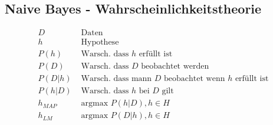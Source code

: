 \documentclass{article}
\newcommand{\prob}{\textit{P}}
\begin{document}
				\subsection*{Naive Bayes - Wahrscheinlichkeitstheorie}
					\begin{align*}
						D & \text{ Daten }\\
						h & \text{ Hypothese}\\
						\prob (h) & \text{ Warsch. dass $h$ erf\"ullt ist}\\
						\prob (D) & \text{ Warsch. dass $D$ beobachtet werden}\\
						\prob (D|h) & \text{ Warsch. dass mann $D$ beobachtet wenn $h$ erf\"ullt ist}\\
						\prob (h|D) & \text{ Warsch. dass $h$ bei $D$ gilt}\\
						h_{MAP} & \text{ argmax } \prob (h|D), h \in H\\
						h_{LM} & \text{ argmax } \prob (D|h), h \in H\\
					\end{align*}
\end{document}
